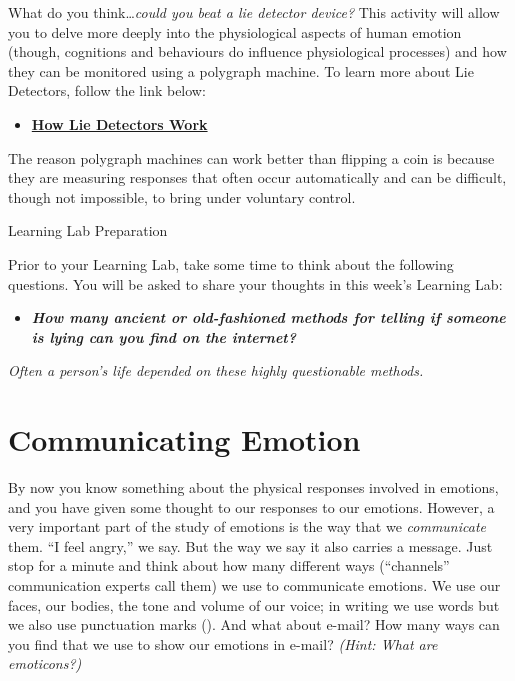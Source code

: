 \documentclass[
]{book}
\providecommand{\tightlist}{%
  \setlength{\itemsep}{0pt}\setlength{\parskip}{0pt}}
\begin{document}
\begin{reflect}
What do you think\ldots{}\emph{could you beat a lie detector device?} This activity will allow you to delve more deeply into the physiological aspects of human emotion (though, cognitions and behaviours do influence physiological processes) and how they can be monitored using a polygraph machine. To learn more about Lie Detectors, follow the link below:

\begin{itemize}
\tightlist
\item
  \href{https://people.howstuffworks.com/lie-detector.htm}{\textbf{How Lie Detectors Work}}
\end{itemize}

The reason polygraph machines can work better than flipping a coin is because they are measuring responses that often occur automatically and can be difficult, though not impossible, to bring under voluntary control.

{Learning Lab Preparation}

Prior to your Learning Lab, take some time to think about the following questions. You will be asked to share your thoughts in this week's Learning Lab:

\begin{itemize}
\tightlist
\item
  \textbf{\emph{How many ancient or old-fashioned methods for telling if someone is lying can you find on the internet?}}
\end{itemize}

\emph{Often a person's life depended on these highly questionable methods.}
\end{reflect}

\hypertarget{communicating-emotion}{%
\section{Communicating Emotion}\label{communicating-emotion}}

By now you know something about the physical responses involved in emotions, and you have given some thought to our responses to our emotions. However, a very important part of the study of emotions is the way that we \emph{communicate} them. ``I feel angry,'' we say. But the way we say it also carries a message. Just stop for a minute and think about how many different ways (``channels'' communication experts call them) we use to communicate emotions. We use our faces, our bodies, the tone and volume of our voice; in writing we use words but we also use punctuation marks (). And what about e-mail? How many ways can you find that we use to show our emotions in e-mail? \emph{(Hint: What are emoticons?)}
\end{document}
